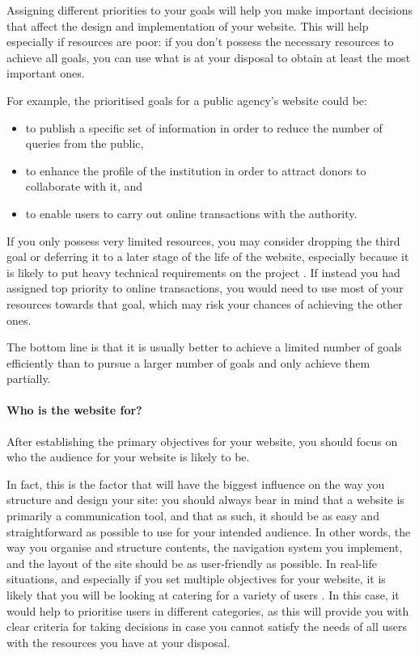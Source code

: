 Assigning different priorities to your goals will help you make important decisions that affect the design and implementation of your website. This will help especially if resources are poor: if you don't possess the necessary resources to achieve all goals, you can use what is at your disposal to obtain at least the most important ones.

For example, the prioritised goals for a public agency's website could be:

\begin{itemize}
	\item to publish a specific set of information in order to reduce the number of queries from the public,
	\item to enhance the profile of the institution in order to attract donors to collaborate with it, and
	\item to enable users to carry out online transactions with the authority.
\end{itemize}

If you only possess very limited resources, you may consider dropping the third goal or deferring it to a later stage of the life of the website, especially because it is likely to put heavy technical requirements on the project . If instead you had assigned top priority to online transactions, you would need to use most of your resources towards that goal, which may risk your chances of achieving the other ones.

The bottom line is that it is usually better to achieve a limited number of goals efficiently than to pursue a larger number of goals and only achieve them partially.

\paragraph{Who is the website for?}

After establishing the primary objectives for your website, you should focus on who the audience for your website is likely to be.

In fact, this is the factor that will have the biggest influence on the way you structure and design your site: you should always bear in mind that a website is primarily a communication tool, and that as such, it should be as easy and straightforward as possible to use for your intended audience. In other words, the way you organise and structure contents, the navigation system you implement, and the layout of the site should be as user-friendly as possible.
In real-life situations, and especially if you set multiple objectives for your website, it is likely that you will be looking at catering for a variety of users . In this case, it would help to prioritise users in different categories, as this will provide you with clear criteria for taking decisions in case you cannot satisfy the needs of all users with the resources you have at your disposal.

